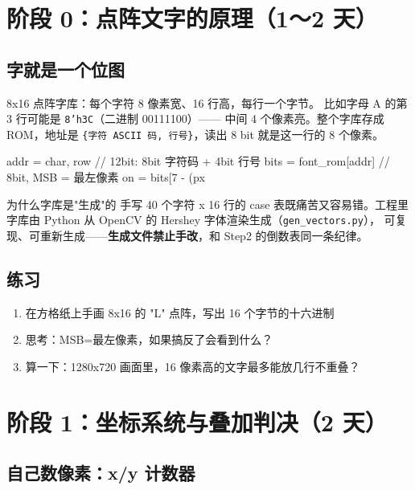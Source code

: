 \documentclass[11pt]{ctexart}
\newcommand{\code}[1]{\texttt{#1}}
\begin{document}
\section{阶段 0：点阵文字的原理（1～2 天）}

\subsection{字就是一个位图}

8x16 点阵字库：每个字符 8 像素宽、16 行高，每行一个字节。
比如字母 A 的第 3 行可能是 \code{8'h3C}（二进制 00111100）——
中间 4 个像素亮。整个字库存成 ROM，地址是
\code{\{字符 ASCII 码, 行号\}}，读出 8 bit 就是这一行的 8 个像素。

\begin{Verilog}
addr = {char, row}          // 12bit: 8bit 字符码 + 4bit 行号
bits = font_rom[addr]       // 8bit, MSB = 最左像素
on   = bits[7 - (px %
\end{Verilog}

\begin{keybox}{为什么字库是"生成"的}
手写 40 个字符 x 16 行的 case 表既痛苦又容易错。工程里字库由
Python 从 OpenCV 的 Hershey 字体渲染生成（\code{gen\_vectors.py}），
可复现、可重新生成——\textbf{生成文件禁止手改}，和 Step2 的倒数表同一条纪律。
\end{keybox}

\subsection{练习}

\begin{enumerate}
  \item 在方格纸上手画 8x16 的 "L" 点阵，写出 16 个字节的十六进制
  \item 思考：MSB=最左像素，如果搞反了会看到什么？
  \item 算一下：1280x720 画面里，16 像素高的文字最多能放几行不重叠？
\end{enumerate}

\section{阶段 1：坐标系统与叠加判决（2 天）}

\subsection{自己数像素：x/y 计数器}
\end{document}
